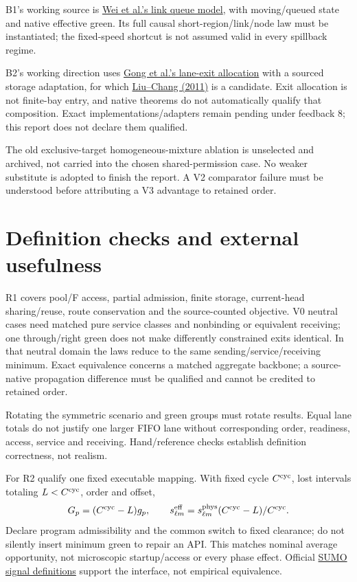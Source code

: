 \documentclass[10pt,a4paper]{article}
\begin{document}
B1's working source is
\href{https://arxiv.org/html/2310.12249v2}{Wei et al.'s link queue model},
with moving/queued state and native effective green. Its full causal
short-region/link/node law must be instantiated; the fixed-speed shortcut
is not assumed valid in every spillback regime.

B2's working direction uses
\href{https://www.sciencedirect.com/science/article/pii/S0191261525000578}
{Gong et al.'s lane-exit allocation} with a sourced storage adaptation,
for which \href{https://attap.umd.edu/wp-content/uploads/2022/05/TRC522.pdf}
{Liu--Chang (2011)} is a candidate. Exit allocation is not finite-bay
entry, and native theorems do not automatically qualify that composition.
Exact implementations/adapters remain pending under feedback 8;
this report does not declare them qualified.

The old exclusive-target homogeneous-mixture ablation is unselected and
archived, not carried into the chosen shared-permission case.
No weaker substitute is adopted to finish the report.
A V2 comparator failure must be understood before attributing a V3
advantage to retained order.

\section{Definition checks and external usefulness}

R1 covers pool/F access, partial admission, finite storage, current-head
sharing/reuse, route conservation and the source-counted objective.
V0 neutral cases need matched pure service classes and nonbinding or
equivalent receiving; one through/right green does not make differently
constrained exits identical. In that neutral domain the laws reduce to
the same sending/service/receiving minimum. Exact equivalence concerns
a matched aggregate backbone; a source-native propagation difference
must be qualified and cannot be credited to retained order.

Rotating the symmetric scenario and green groups must rotate results.
Equal lane totals do not justify one larger FIFO lane without
corresponding order, readiness, access, service and receiving.
Hand/reference checks establish definition correctness, not realism.

For R2 qualify one fixed executable mapping. With fixed cycle
$C^{\rm cyc}$, lost intervals totaling $L<C^{\rm cyc}$, order and offset,
\begin{equation}
 G_p=(C^{\rm cyc}-L)g_p,\qquad
 s^{\rm eff}_{\ell m}=s^{\rm phys}_{\ell m}
                         (C^{\rm cyc}-L)/C^{\rm cyc}.
 \label{eq:reference-action}
\end{equation}
Declare program admissibility and the common switch to fixed clearance;
do not silently insert minimum green to repair an API.
This matches nominal average opportunity, not microscopic startup/access
or every phase effect. Official
\href{https://sumo.dlr.de/docs/Simulation/Traffic_Lights.html}
{SUMO signal definitions} support the interface, not empirical equivalence.
\end{document}
